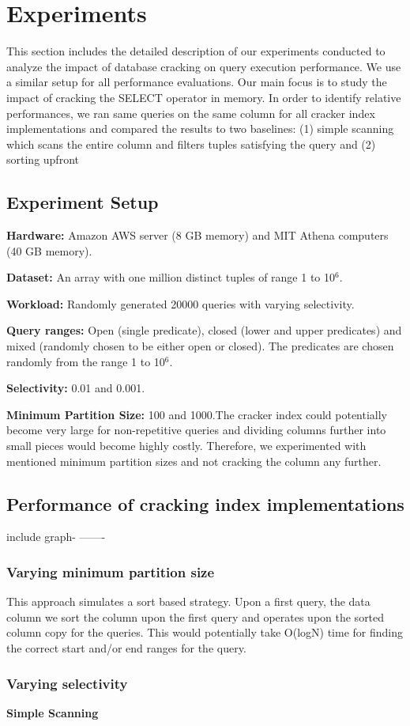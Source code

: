 \section{Experiments}
This section includes the detailed description of our experiments conducted to analyze the impact of database cracking on query execution performance. We use a similar setup for all performance evaluations. Our main focus is to study the impact of cracking the SELECT operator in memory. In order to identify relative performances, we ran same queries on the same column for all cracker index implementations and compared the results to two baselines: (1) simple scanning which scans the entire column and filters tuples satisfying the query and (2) sorting upfront 

\subsection{Experiment Setup}

\textbf{Hardware:} Amazon AWS server (8 GB memory) and MIT Athena computers (40 GB memory). 

\textbf{Dataset:} An array with one million distinct tuples of range 1 to 10${^6}$. 

\textbf{Workload:} Randomly generated 20000 queries with varying selectivity.

\textbf{Query ranges:} Open (single predicate), closed (lower and upper predicates) and mixed (randomly chosen to be either open or closed).
The predicates are chosen randomly from the range 1 to 10${^6}$.

\textbf{Selectivity:} 0.01 and 0.001. 

\textbf{Minimum Partition Size: } 100 and 1000.The cracker index could potentially become very large for non-repetitive queries and dividing columns further into small pieces would become highly costly. Therefore, we experimented with mentioned minimum partition sizes and not cracking the column any further.
\subsection{Performance of cracking index implementations}

include graph- -------

\subsubsection{Varying minimum partition size}


This approach simulates a sort based strategy. Upon a first query, the data column we sort the column upon the first query and operates upon the sorted column copy for the queries. This would potentially take O(logN) time for finding the correct start and/or end ranges for the query.

\subsubsection{Varying selectivity}

\textbf{Simple Scanning}
\label{sec:experiments}

